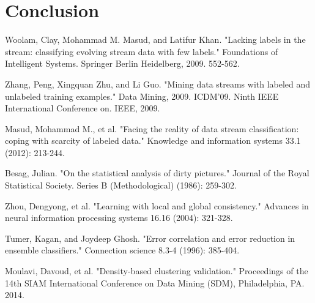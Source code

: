 \documentclass[12pt,a4paper,oneside]{report}
\begin{document}
\section{Conclusion}
\begin{thebibliography}{20}

Woolam, Clay, Mohammad M. Masud, and Latifur Khan. "Lacking labels in the stream: classifying evolving stream data with few labels." Foundations of Intelligent Systems. Springer Berlin Heidelberg, 2009. 552-562.

Zhang, Peng, Xingquan Zhu, and Li Guo. "Mining data streams with labeled and unlabeled training examples." Data Mining, 2009. ICDM'09. Ninth IEEE International Conference on. IEEE, 2009.

Masud, Mohammad M., et al. "Facing the reality of data stream classification: coping with scarcity of labeled data." Knowledge and information systems 33.1 (2012): 213-244.

Besag, Julian. "On the statistical analysis of dirty pictures." Journal of the Royal Statistical Society. Series B (Methodological) (1986): 259-302.

Zhou, Dengyong, et al. "Learning with local and global consistency." Advances in neural information processing systems 16.16 (2004): 321-328.

Tumer, Kagan, and Joydeep Ghosh. "Error correlation and error reduction in ensemble classifiers." Connection science 8.3-4 (1996): 385-404.

Moulavi, Davoud, et al. "Density-based clustering validation." Proceedings of the 14th SIAM International Conference on Data Mining (SDM), Philadelphia, PA. 2014.

\end{thebibliography}
\end{document}
